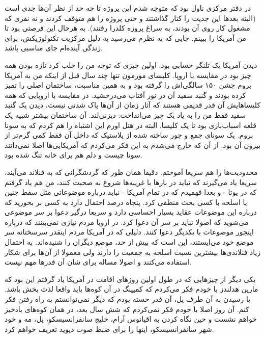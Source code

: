 در دفتر مرکزی ناول بود که متوجه شدم این پروژه تا چه حد از نظر آن‌ها جدی
است (البته بعدها این جدیت را کنار گذاشتند و حتی پروژه را هم متوقف
کردند و نه نفری که مشغول کار روی آن بودند، به سراغ پروزه
کلدرا
رفتند). به هرحال این فرصتی بود تا من آمریکا را ببینم. جایی که به نظرم
می‌رسید به دلیل مرکزیت تکنولوژیکش، برای زندگی‌ آینده‌ام جای مناسبی باشد.

دیدن آمریکا یک تلنگر حسابی بود. اولین چیزی که توجه من را جلب کرد تازه
بودن همه چیز بود در مقایسه با اروپا. کلیسای مورمون تنها چند سال قبل از
اینکه من به آمریکا بروم جشن ۱۵۰ سالگی‌اش را گرفته بود و به همین مناسبت،
ساختمان اصلی را تمیز کرده بودند و گنبد سفید آن در نور آفتاب
می‌درخشید. در مقایسه با اروپایی که همه کلیساهایش آن قدر قدیمی هستند که
آثار زمان از آن‌ها پاک شدنی نیست، دیدن یک گنبد سفید فقط من را به یاد یک
چیز می‌انداخت: دیزنی‌لند. آن ساختمان بیشتر شبیه یک قلعه اسباب‌بازی بود تا
یک کلیسا. البته در هتل اورم این اشتباه را هم کردم که به سونا بروم. یک
سونای جمع و جور ساخته شده از پلاستیک که داخل آن فقط کمی گرم‌تر از بیرون
آن بود. از آن که خارج می‌شدم به این فکر می‌کردم که آمریکایی‌ها اصلا
نمی‌دانند سونا چیست و دلم هم برای خانه تنگ شده بود.

محدودیت‌ها را هم سریعا آموختم. دقیقا همان طور که گردشگرانی که به فنلاند
می‌آیند، سریعا یاد می‌گیرند که نباید در بارها با غریبه‌ها شروع به صحبت‌
کنند، من هم یاد گرفتم که در یوتا - و بعدا فهمیدم که در تمام آمریکا -
نباید درباره موضوعاتی مثل سقط جنین یا اسلحه با کسی بحث منطقی
کرد. پنجاه درصد احتمال دارد به کسی بر بخورید که درباره این موضوعات
عقاید بسیار احساسی دارد و سریعا درگیر دعوا بر سر موضوعی می‌شوید که اصولا
نباید بر سر آن دعوا کرد. در اروپا مردم نیازی نمی‌بینند که درباره اینجور
موضوعات با یکدیگر دعوا کنند. دلیلی که در آمریکا مردم اینقدر سرسختانه
سر موضع خود می‌ایستند، این است که بیش از حد، موضع دیگران را
شنیده‌اند. به احتمال زیاد فنلاندی‌ها بیشترین نسبت اسلحه به جمعیت را
دارند ولی معمولا از آن‌ها برای شکار استفاده می‌کنند و اصولا مساله برای
شان آن قدرها مهم نیست.

یکی دیگر از چیزهایی که در طول اولین روزهای اقامت در آمریکا یاد گرفتم
این بود که مارین هدلندز با خودم فکر می‌کردم
که کمپینگ در آن کوه‌ها باید واقعا لذت بخش باشد. با رسیدن به آن طرف پل،
آن قدر خسته بودم که دیگر نمی‌توانستم به راه رفتن فکر کنم. آن روز اصلا
با خودم فکر نمی‌کردم که شش سال بعد، در همان کوه‌های بادخیز خواهم نشست و
حین نگاه کردن به اقیانوس‌ آرام، خلیج سانفرانسیسکو، پل، مه و خود شهر
سانفرانسیسکو، اینها را برای ضبط صوت دیوید تعریف خواهم کرد.

